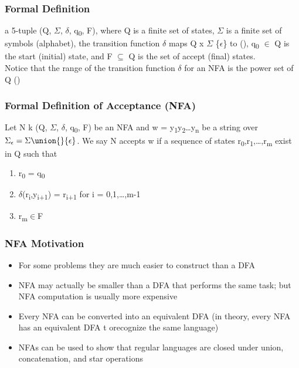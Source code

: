 \documentclass[11pt]{article}
\begin{document}
\subsubsection{Formal Definition}
\label{sec:org16a63b7}
a 5-tuple (Q, \(\Sigma\), \(\delta\), q\textsubscript{0}, F), where Q is a finite set of states, \(\Sigma\) is a finite set of symbols (alphabet), the transition function \(\delta\) maps Q x \(\Sigma\) \union \{\(\epsilon\)\} to (), q\textsubscript{0} \(\in\) Q is the start (initial) state, and F \(\subseteq{}\) Q is the set of accept (final) states.\\

Notice that the range of the transition function \(\delta\) for an NFA is the power set of Q ()\\
\subsubsection{Formal Definition of Acceptance (NFA)}
\label{sec:orgb84cb81}
Let N  k (Q, \(\Sigma\), \(\delta\), q\textsubscript{0}, F) be an NFA and w = y\textsubscript{1}y\textsubscript{2}\ldots{}y\textsubscript{n} be a string over \(\Sigma_{\epsilon}=\Sigma{}\union{}{\epsilon}\). We say N accepts w if a sequence of states r\textsubscript{0},r\textsubscript{1},\ldots{},r\textsubscript{m} exist in Q such that\\
\begin{enumerate}
\item r\textsubscript{0} = q\textsubscript{0}\\
\item \(\delta\)(r\textsubscript{i},y\textsubscript{i+1}) = r\textsubscript{i+1} for i = 0,1,\ldots{},m-1\\
\item r\textsubscript{m}\(\in\)F\\
\end{enumerate}
\subsubsection{NFA Motivation}
\label{sec:org9d629ac}
\begin{itemize}
\item For some problems they are much easier to construct than a DFA\\
\item NFA may actually be smaller than a DFA that performs the same task; but NFA computation is usually more expensive\\
\item Every NFA can be converted into an equivalent DFA (in theory, every NFA has an equivalent DFA t orecognize the same language)\\
\item NFAs can be used to show that regular languages are closed under union, concatenation, and star operations\\
\end{itemize}
\end{document}
